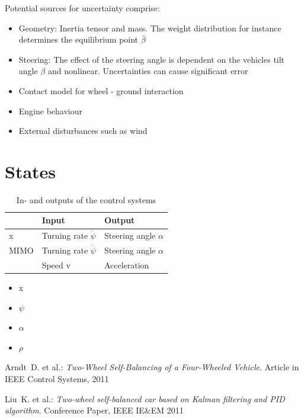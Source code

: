 \documentclass[conference]{IEEEtran}
\begin{document}
Potential sources for uncertainty comprise:

\begin{itemize}
    \item Geometry: Inertia tensor and mass. The weight distribution for instance determines the equilibrium point $\bar{\beta}$
    \item Steering: The effect of the steering angle is dependent on the vehicles tilt angle $\beta$ and nonlinear. Uncertainties can cause significant error
    \item Contact model for wheel - ground interaction
    \item Engine behaviour
    \item External disturbances such as wind
\end{itemize}


 

\section{States}

\begin{table}[h]
\begin{center}
\begin{tabular}{|l||l|l|}
\hline
 		& Input 		& Output\\
\hline
x 	& Turning rate $\dot{\psi}$ 	& Steering angle $\alpha$\\
\hline
MIMO 	& Turning rate $\dot{\psi}$ 	& Steering angle $\alpha$\\
     	& Speed v 		& Acceleration\\
\hline
\end{tabular}
\caption{In- and outputs of the control systems}  
\label{figure:controlinout}
\end{center}
\end{table}

\begin{itemize}
    \item x
    \item $\psi$
    \item $\alpha$
    \item $\rho$
\end{itemize}


 
 
 
\begin{thebibliography}{1}

 {\sc Arndt~D. et al.}: {\it Two-Wheel Self-Balancing of a Four-Wheeled Vehicle}. Article in IEEE Control Systems, 2011

 {\sc Liu~K. et al.}: {\it Two-wheel self-balanced car based on Kalman filtering and PID algorithm}. Conference Paper, IEEE IE\&EM 2011


\end{thebibliography}


\end{document}
